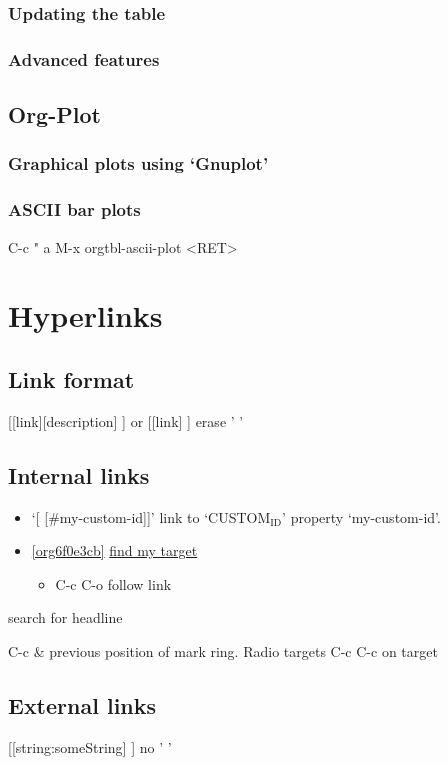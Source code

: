 \documentclass[11pt]{article}
\begin{document}
\subsubsection{Updating the table}
\label{sec:orga6d4922}
\subsubsection{Advanced features}
\label{sec:org3a1b23b}
\subsection{Org-Plot}
\label{sec:org4d8cb07}
\subsubsection{Graphical plots using ‘Gnuplot’}
\label{sec:orgcfcd711}
\subsubsection{ASCII bar plots}
\label{sec:org8a265ed}
C-c " a
M-x orgtbl-ascii-plot <RET>
\section{Hyperlinks}
\label{sec:org5c1fc01}
\subsection{Link format}
\label{sec:orgc50d120}
[[link][description] ] or [[link] ]   erase ' '
\subsection{Internal links}
\label{sec:org081b1aa}
\begin{itemize}
\item ‘[ [\#my-custom-id]]’ link to ‘CUSTOM\(_{\text{ID}}\)’ property ‘my-custom-id’.
\item \ref{org6f0e3cb} \hyperref[org6f0e3cb]{find my target}
\begin{itemize}
\item C-c C-o follow link
\end{itemize}
\end{itemize}
\label{org6f0e3cb}
search for headline

C-c \&  previous position of mark ring.
Radio targets C-c C-c on target
\subsection{External links}
\label{sec:org179efc9}
[[string:someString] ]    no ' '
\end{document}
